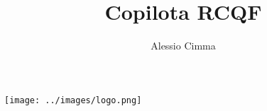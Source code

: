 \documentclass{article}
\title{Copilota RCQF}
\author{Alessio Cimma}
\begin{document}
\maketitle

\begin{center}
	\texttt{[image: ../images/logo.png]}
\end{center}

\newpage
\tableofcontents

\end{document}
